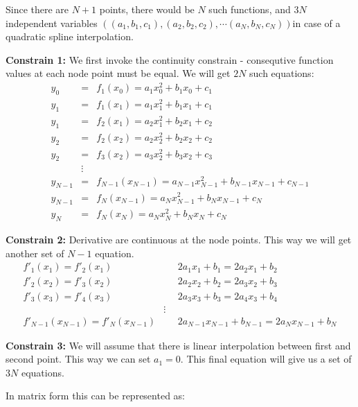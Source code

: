 \documentclass[11pt,titlepage,fleqn]{article}
\begin{document}
Since there are $N+1$ points, there would be $N$ such functions, and $3N$ independent variables $((a_1,b_1,c_1), (a_2,b_2,c_2), \cdots (a_N,b_N,c_N))$in case of a quadratic spline interpolation.

{\bf Constrain 1:} We first invoke the continuity constrain - consequtive function values at each node point must be equal.
We will get $2N$ such equations:
\begin{eqnarray*}
y_0 &=& f_1(x_0) = a_1 x_0^2 + b_1x_0 + c_1 \\
y_1 &=& f_1(x_1) = a_1 x_1^2 + b_1x_1 + c_1 \\
y_1 &=& f_2(x_1) = a_2 x_1^2 + b_2x_1 + c_2 \\
y_2 &=& f_2(x_2) = a_2 x_2^2 + b_2x_2 + c_2 \\
y_2 &=& f_3(x_2) = a_3 x_2^2 + b_3x_2 + c_3 \\
&\vdots& \\
y_{N-1} &=& f_{N-1}(x_{N-1}) = a_{N-1} x_{N-1}^2 + b_{N-1}x_{N-1} + c_{N-1} \\
y_{N-1} &=& f_{N}(x_{N-1}) = a_N x_{N-1}^2 + b_Nx_{N-1} + c_N \\
y_N &=& f_N(x_N) = a_N x_N^2 + b_Nx_N + c_N
\end{eqnarray*}

{\bf Constrain 2:} Derivative are continuous at the node points. This way we will get another set of $N-1$ equation.
\begin{eqnarray*}
f'_1(x_1) = f'_2(x_1) &\,\,\,\,  & 2 a_1 x_1 + b_1 = 2 a_2 x_1 + b_2\\
f'_2(x_2) = f'_3(x_2) &\,\,\,\,  & 2 a_2 x_2 + b_2 = 2 a_3 x_2 + b_3\\
f'_3(x_3) = f'_4(x_3) &\,\,\,\,  & 2 a_3 x_3 + b_3 = 2 a_4 x_3 + b_4\\
&\vdots&\\
f'_{N-1}(x_{N-1}) = f'_N(x_{N-1}) &\,\,\,\,  & 2 a_{N-1} x_{N-1} + b_{N-1} = 2 a_N x_{N-1} + b_N
\end{eqnarray*}

{\bf Constrain 3:} We will assume that there is linear interpolation between first and second point. This way we can set $a_1=0$. This final equation will give us a set of $3N$ equations.

In matrix form this can be represented as:
\end{document}
